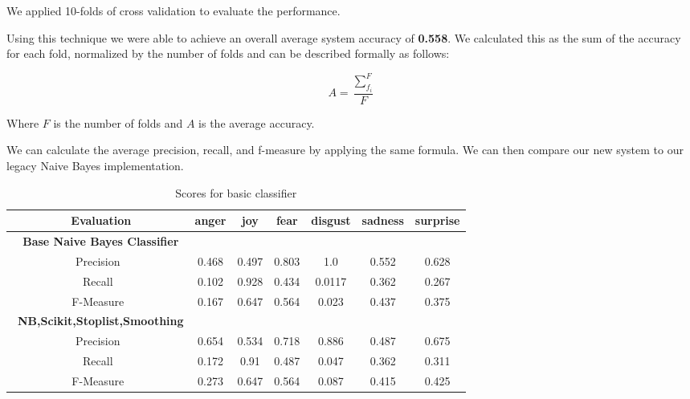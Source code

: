 We applied 10-folds of cross validation to evaluate the performance.

Using this technique we were able to achieve an overall average system accuracy of \textbf{0.558}. We calculated this as the sum of the accuracy for each fold, normalized by the number of folds and can be described formally as follows:

\begin{equation}
A = \frac{\sum_{f_i}^{F}}{F}
\end{equation}

Where $F$ is the number of folds and $A$ is the average accuracy.

We can calculate the average precision, recall, and f-measure by applying the same formula. We can then compare our new system to our legacy Naive Bayes implementation.



\begin{table}[H]
\center
 \begin{tabular}{|c|c|c|c|c|c|c|} 
 \hline
 \ Evaluation & \textbf{anger} & \textbf{joy} & \textbf{fear} & \textbf{disgust} & \textbf{sadness} & \textbf{surprise} \\ [0.5ex] 
 \hline
 \ \textbf{Base Naive Bayes Classifier} & & & & & &  \\ [0.5ex] 
 \hline
 Precision & 0.468 & 0.497 & 0.803 & 1.0 & 0.552 & 0.628 \\ 
 \hline
 Recall & 0.102 & 0.928 & 0.434 & 0.0117 & 0.362 & 0.267 \\
 \hline
 F-Measure & 0.167 & 0.647 & 0.564 & 0.023 & 0.437 & 0.375 \\
 \hline
 \ \textbf{NB,Scikit,Stoplist,Smoothing} & & & & & &  \\ [0.5ex] 
 \hline
  Precision & 0.654 & 0.534 & 0.718 & 0.886 & 0.487 & 0.675 \\ 
 \hline
 Recall & 0.172 & 0.91 & 0.487 & 0.047 & 0.362 & 0.311 \\
 \hline
 F-Measure & 0.273 & 0.647 & 0.564 & 0.087 & 0.415 & 0.425 \\
 \hline
\end{tabular}
\caption{Scores for basic classifier}
\end{table}

